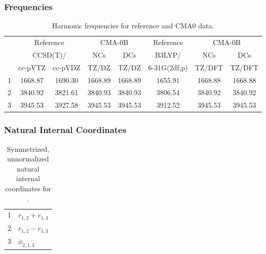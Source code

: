 \documentclass[10pt,oneside]{article}
\begin{document}
\clearpage

\subsubsection*{Frequencies}
\begin{table}[h!]
\centering
\caption{Harmonic frequencies for reference and CMA0 data.}
\begin{tabular}{cccccccc}
\toprule
{} & \multicolumn{2}{c}{Reference} & \multicolumn{2}{c}{CMA-0B} &    Reference & \multicolumn{2}{c}{CMA-0B} \\
{} & \multicolumn{2}{c}{CCSD(T)/} &     NCs &     DCs &       B3LYP/ &     NCs &     DCs \\
{} &   cc-pVTZ & cc-pVDZ &   TZ/DZ &   TZ/DZ & 6-31G(2df,p) &  TZ/DFT &  TZ/DFT \\
\midrule
1 &   1668.87 & 1690.30 & 1668.89 & 1668.89 &      1655.91 & 1668.88 & 1668.88 \\
2 &   3840.92 & 3821.61 & 3840.93 & 3840.93 &      3806.54 & 3840.92 & 3840.92 \\
3 &   3945.53 & 3927.58 & 3945.53 & 3945.53 &      3912.52 & 3945.53 & 3945.53 \\
\bottomrule
\end{tabular}
\end{table}

\clearpage

\subsubsection*{Natural Internal Coordinates}
\begin{table}[h!]
\centering
\caption{Symmetrized, unnormalized natural internal coordinates for .}
\small
\begin{tabular}{ll}
  1   & $r_{1,2} + r_{1,3}$ \\
  2   & $r_{1,2} - r_{1,3}$ \\
  3   & $\phi_{2,1,3}$ \\
\end{tabular}
\end{table}

\clearpage

\subsection{\ \ \ }
\end{document}
